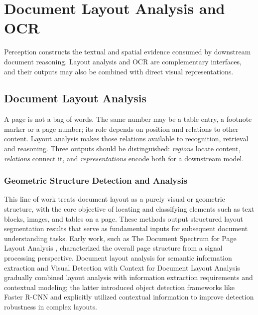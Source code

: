 \section{Document Layout Analysis and OCR}
\label{sec:layout_ocr}

Perception constructs the textual and spatial evidence consumed by downstream
document reasoning. Layout analysis and OCR are complementary interfaces, and
their outputs may also be combined with direct visual representations.

\subsection{Document Layout Analysis}

A page is not a bag of words. The same number may be a table entry, a footnote marker or a page number; its role depends on position and relations to other content. Layout analysis makes those relations available to recognition, retrieval and reasoning. Three outputs should be distinguished: \emph{regions} locate content, \emph{relations} connect it, and \emph{representations} encode both for a downstream model.

\subsubsection{Geometric Structure Detection and Analysis}

This line of work treats document layout as a purely visual or geometric structure, with the core objective of locating and classifying elements such as text blocks, images, and tables on a page. These methods output structured layout segmentation results that serve as fundamental inputs for subsequent document understanding tasks. Early work, such as The Document Spectrum for Page Layout Analysis \cite{ogorman1993documentspectrum}, characterized the overall page structure from a signal processing perspective. Document layout analysis for semantic information extraction \cite{ferrara2017documentlayoutsemantic} and Visual Detection with Context for Document Layout Analysis \cite{soto2019visual} gradually combined layout analysis with information extraction requirements and contextual modeling; the latter introduced object detection frameworks like Faster R-CNN and explicitly utilized contextual information to improve detection robustness in complex layouts.

